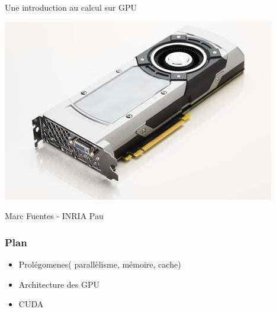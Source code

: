 \documentclass[11pt,mathserif]{beamer}
\begin{document}
\begin{frame}
\begin{center}
{\Large Une introduction au calcul sur GPU} 
\end{center}
\begin{center}
\includegraphics[width=0.5\linewidth]{gpu.jpg}
\end{center}
\begin{center}
{\large Marc Fuentes - INRIA Pau\\ }
\end{center}
\end{frame}


\begin{frame}
\frametitle{Plan}

\begin{itemize}[<+->]
\item Prolégomenes( parallèlisme, mémoire, cache)
\item Architecture des GPU
\item CUDA
\end{itemize}
\end{frame}
\end{document}
